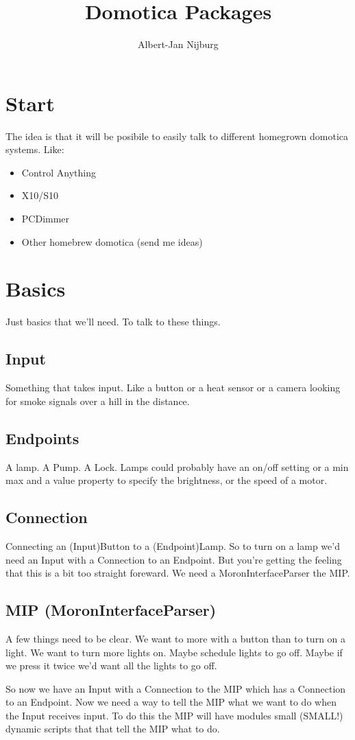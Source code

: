 \documentclass[a4paper]{article}
\author{Albert-Jan Nijburg}
\title{Domotica Packages}
\begin{document}
\maketitle
\section{Start}
The idea is that it will be posibile to easily talk to different homegrown domotica systems. Like:
\begin{itemize}
\item Control Anything
\item X10/S10
\item PCDimmer
\item Other homebrew domotica (send me ideas)
\end{itemize}
\section{Basics}
Just basics that we'll need. To talk to these things. 
\subsection{Input}
Something that takes input. Like a button or a heat sensor or a camera looking for smoke signals over a hill in the distance.
\subsection{Endpoints}
A lamp. A Pump. A Lock. Lamps could probably have an on/off setting or a min max and a value property to specify the brightness, or the speed of a motor. 
\subsection{Connection}
Connecting an (Input)Button to a (Endpoint)Lamp. So to turn on a lamp we'd need an Input with a Connection to an Endpoint. But you're getting the feeling that this is a bit too straight foreward. We need a MoronInterfaceParser the MIP. 
\subsection{MIP (MoronInterfaceParser)}
A few things need to be clear. We want to more with a button than to turn on a light. We want to turn more lights on. Maybe schedule lights to go off. Maybe if we press it twice we'd want all the lights to go off. 

So now we have an Input with a Connection to the MIP which has a Connection to an Endpoint. Now we need a way to tell the MIP what we want to do when the Input receives input. To do this the MIP will have modules small (SMALL!) dynamic scripts that that tell the MIP what to do. 
\end{document}
